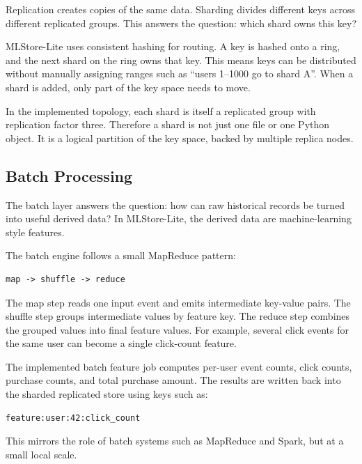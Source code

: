 Replication creates copies of the same data. Sharding divides different keys
across different replicated groups. This answers the question: which shard owns
this key?

MLStore-Lite uses consistent hashing for routing. A key is hashed onto a ring,
and the next shard on the ring owns that key. This means keys can be distributed
without manually assigning ranges such as ``users 1--1000 go to shard A''. When
a shard is added, only part of the key space needs to move.

In the implemented topology, each shard is itself a replicated group with
replication factor three. Therefore a shard is not just one file or one Python
object. It is a logical partition of the key space, backed by multiple replica
nodes.

\subsection{Batch Processing}

The batch layer answers the question: how can raw historical records be turned
into useful derived data? In MLStore-Lite, the derived data are machine-learning
style features.

The batch engine follows a small MapReduce pattern:

\begin{verbatim}
map -> shuffle -> reduce
\end{verbatim}

The map step reads one input event and emits intermediate key-value pairs. The
shuffle step groups intermediate values by feature key. The reduce step combines
the grouped values into final feature values. For example, several click events
for the same user can become a single click-count feature.

The implemented batch feature job computes per-user event counts, click counts,
purchase counts, and total purchase amount. The results are written back into
the sharded replicated store using keys such as:

\begin{verbatim}
feature:user:42:click_count
\end{verbatim}

This mirrors the role of batch systems such as MapReduce and Spark, but at a
small local scale.
